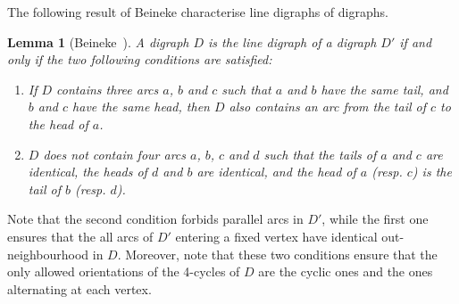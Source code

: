 \documentclass[11pt,a4aper]{article}
\newtheorem{lemma}[theorem]{Lemma}
\begin{document}
The following result of Beineke characterise line digraphs of digraphs.
\begin{lemma}[Beineke~\cite{beineke1968Derived}]
  A digraph $D$ is the line digraph of a digraph $D'$ if and only if the two
  following conditions are satisfied:
  \begin{enumerate}
  \item If $D$ contains three arcs $a$, $b$ and $c$ such that $a$ and $b$ have
    the same tail, and $b$ and $c$ have the same head, then $D$ also contains an
    arc from the tail of $c$ to the head of $a$.
  \item $D$ does not contain four arcs $a$, $b$, $c$ and $d$ such that the tails
    of $a$ and $c$ are identical, the heads of $d$ and $b$ are identical, and
    the head of $a$ (resp. $c$) is the tail of $b$ (resp. $d$).  
  \end{enumerate}
\end{lemma}

  

Note that the second condition forbids parallel arcs in $D'$, while the first
one ensures that the all arcs of $D'$ entering a fixed vertex have identical
out-neighbourhood in $D$. Moreover, note
that these two conditions ensure that the only allowed orientations of the 4-cycles
of $D$ are the cyclic ones and the ones alternating at each vertex.
\end{document}
